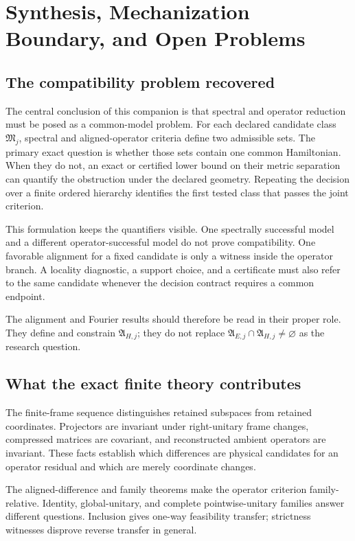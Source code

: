 \chapter{Synthesis, Mechanization Boundary, and Open Problems}
\label{ch:mechanization-status}

\section{The compatibility problem recovered}

The central conclusion of this companion is that spectral and operator reduction must be
posed as a common-model problem.  For each declared candidate class
$\mathfrak M_j$, spectral and aligned-operator criteria define two admissible sets.  The
primary exact question is whether those sets contain one common Hamiltonian.  When they
do not, an exact or certified lower bound on their metric separation can quantify the
obstruction under the declared geometry.  Repeating the decision over a finite ordered
hierarchy identifies the first tested class that passes the joint criterion.

This formulation keeps the quantifiers visible.  One spectrally successful model and a
different operator-successful model do not prove compatibility.  One favorable
alignment for a fixed candidate is only a witness inside the operator branch.  A
locality diagnostic, a support choice, and a certificate must also refer to the same
candidate whenever the decision contract requires a common endpoint.

The alignment and Fourier results should therefore be read in their proper role.  They
define and constrain $\mathfrak A_{H,j}$; they do not replace
$\mathfrak A_{E,j}\cap\mathfrak A_{H,j}\neq\varnothing$ as the research question.

\section{What the exact finite theory contributes}

The finite-frame sequence distinguishes retained subspaces from retained coordinates.
Projectors are invariant under right-unitary frame changes, compressed matrices are
covariant, and reconstructed ambient operators are invariant.  These facts establish
which differences are physical candidates for an operator residual and which are merely
coordinate changes.

The aligned-difference and family theorems make the operator criterion
family-relative.  Identity, global-unitary, and complete pointwise-unitary families
answer different questions.  Inclusion gives one-way feasibility transfer; strictness
witnesses disprove reverse transfer in general.

